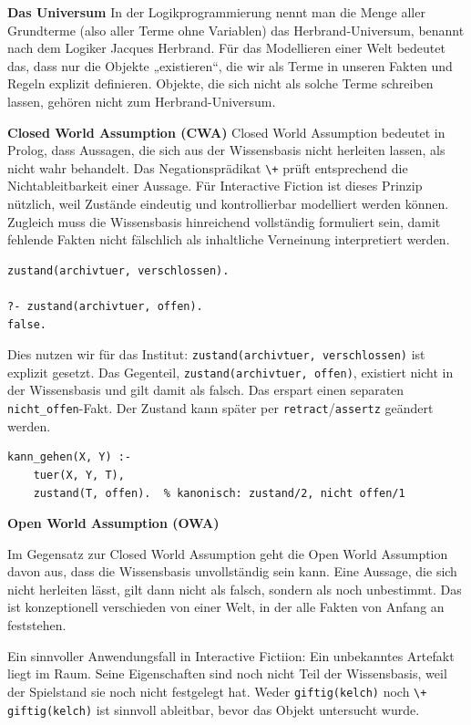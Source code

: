 \documentclass[parskip=half,a4paper,11pt]{scrreprt}
\begin{document}
\textbf{Das Universum}
In der Logikprogrammierung nennt man die Menge aller Grundterme (also aller Terme ohne Variablen) das Herbrand‑Universum, benannt nach dem Logiker Jacques Herbrand. Für das Modellieren einer Welt bedeutet das, dass nur die Objekte „existieren“, die wir als Terme in unseren Fakten und Regeln explizit definieren. Objekte, die sich nicht als solche Terme schreiben lassen, gehören nicht zum Herbrand-Universum.

\textbf{Closed World Assumption (CWA)}
Closed World Assumption bedeutet in Prolog, dass Aussagen, die sich aus der Wissensbasis nicht herleiten lassen, als nicht wahr behandelt. Das Negationsprädikat \texttt{\textbackslash+} prüft entsprechend die Nichtableitbarkeit einer Aussage. Für Interactive Fiction ist dieses Prinzip nützlich, weil Zustände eindeutig und kontrollierbar modelliert werden können. Zugleich muss die Wissensbasis hinreichend vollständig formuliert sein, damit fehlende Fakten nicht fälschlich als inhaltliche Verneinung interpretiert werden. \\
\begin{lstlisting}[caption={}]
% Die archivtuer existiert, ist aber nicht als offen definiert.
zustand(archivtuer, verschlossen).

?- zustand(archivtuer, offen).
false.
\end{lstlisting}
Dies nutzen wir für das Institut: \texttt{zustand(archivtuer, verschlossen)} ist explizit gesetzt. Das Gegenteil, \texttt{zustand(archivtuer, offen)}, existiert nicht in der Wissensbasis und gilt damit als falsch. Das erspart einen separaten \texttt{nicht\_offen}-Fakt. Der Zustand kann später per \texttt{retract}/\texttt{assertz} geändert werden.

\begin{lstlisting}[caption={}]
% Nur passierbar, wenn die Tuer offen ist (CWA: alle anderen sind zu)
kann_gehen(X, Y) :-
    tuer(X, Y, T),
    zustand(T, offen).  % kanonisch: zustand/2, nicht offen/1
\end{lstlisting}
\textbf{Open World Assumption (OWA)}

Im Gegensatz zur Closed World Assumption geht die Open World Assumption davon aus, dass die Wissensbasis unvollständig sein kann. Eine Aussage, die sich nicht herleiten lässt, gilt dann nicht als falsch, sondern als noch unbestimmt. Das ist konzeptionell verschieden von einer Welt, in der alle Fakten von Anfang an feststehen. 

Ein sinnvoller Anwendungsfall in Interactive Fictiion: Ein unbekanntes Artefakt liegt im Raum. Seine Eigenschaften sind noch nicht Teil der Wissensbasis, weil der Spielstand sie noch nicht festgelegt hat. Weder \texttt{giftig(kelch)} noch \texttt{\textbackslash+ giftig(kelch)} ist sinnvoll ableitbar, bevor das Objekt untersucht wurde. 
\end{document}
